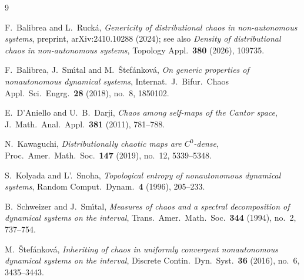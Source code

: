 \documentclass[11pt]{article}
\begin{document}
\begin{thebibliography}{9}

F.~Balibrea and L.~Ruck\'a,
\emph{Genericity of distributional chaos in non-autonomous systems},
preprint, arXiv:2410.10288 (2024); see also
\emph{Density of distributional chaos in non-autonomous systems},
Topology Appl.\ \textbf{380} (2026), 109735.

F.~Balibrea, J.~Sm\'\i tal and M.~\v Stef\'ankov\'a,
\emph{On generic properties of nonautonomous dynamical systems},
Internat.\ J.\ Bifur.\ Chaos Appl.\ Sci.\ Engrg.\ \textbf{28} (2018), no.~8,
1850102.

E.~D'Aniello and U.~B.~Darji,
\emph{Chaos among self-maps of the Cantor space},
J.\ Math.\ Anal.\ Appl.\ \textbf{381} (2011), 781--788.

N.~Kawaguchi,
\emph{Distributionally chaotic maps are $C^0$-dense},
Proc.\ Amer.\ Math.\ Soc.\ \textbf{147} (2019), no.~12, 5339--5348.

S.~Kolyada and L'.~Snoha,
\emph{Topological entropy of nonautonomous dynamical systems},
Random Comput.\ Dynam.\ \textbf{4} (1996), 205--233.

B.~Schweizer and J.~Sm\'\i tal,
\emph{Measures of chaos and a spectral decomposition of dynamical systems on the
interval},
Trans.\ Amer.\ Math.\ Soc.\ \textbf{344} (1994), no.~2, 737--754.

M.~\v Stef\'ankov\'a,
\emph{Inheriting of chaos in uniformly convergent nonautonomous dynamical systems
on the interval},
Discrete Contin.\ Dyn.\ Syst.\ \textbf{36} (2016), no.~6, 3435--3443.

\end{thebibliography}
\end{document}
